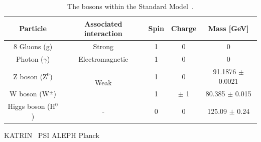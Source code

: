 \documentclass[main.tex]{subfiles}
\begin{document}
\begin{table}[h!]
\centering
\begin{tabular}{c|c|c|c|c}
\toprule 
Particle & Associated interaction & Spin & Charge & Mass [GeV] \\  [0.1cm]
\hline 
8 Gluons (g)           & Strong                & 1 & 0       & 0 \\  [0.1cm]
Photon ($\gamma$)      & Electromagnetic       & 1 & 0       & 0 \\  [0.1cm]
Z boson (Z$^\text{0}$) & \multirow{2}{*}{Weak} & 1 & 0       & 91.1876 $\pm$ 0.0021 \\  [0.1cm]
W boson (W$^\pm$)      &                       & 1 & $\pm$ 1 & 80.385 $\pm$ 0.015   \\  [0.1cm] 
\hline 
Higgs boson (H$^\text{0}$) & - & 0 & 0 & 125.09 $\pm$ 0.24 \\  [0.1cm]
\bottomrule 
\end{tabular} 
\caption{The bosons within the Standard Model~\cite{PDG2016}.}
\label{tab:BosonSM}
\end{table}











KATRIN~\cite{KATRIN}
PSI\cite{PSI}
ALEPH \cite{ALEPHneutrinoTau}
Planck ~\cite{PlankNeutrinoMass}
\end{document}
